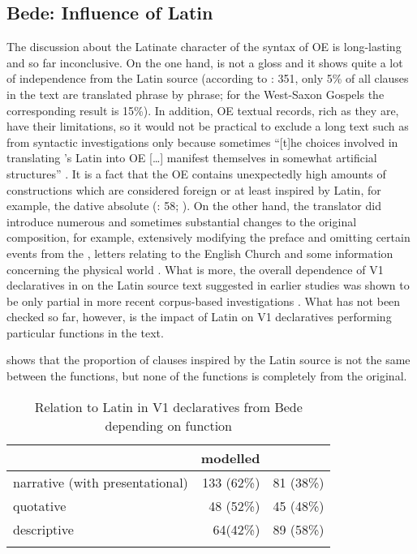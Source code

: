 \documentclass[output=paper,colorlinks,citecolor=brown]{langscibook}
\begin{document}
\subsection{Bede: Influence of Latin}
\label{sec:cichosz:4.2}

The discussion about the Latinate character of the syntax of OE  is long-lasting and so far inconclusive. On the one hand,  is not a gloss and it shows quite a lot of independence from the Latin source (according to \citealt{CichoszEtAl2016}: 351, only 5\% of all clauses in the text are translated phrase by phrase; for the West-Saxon Gospels the corresponding result is 15\%). In addition, OE textual records, rich as they are, have their limitations, so it would not be practical to exclude a long text such as  from syntactic investigations only because sometimes “[t]he choices involved in translating 's Latin into OE […] manifest themselves in somewhat artificial structures” \citep[9]{Rowley2011}. It is a fact that the OE  contains unexpectedly high amounts of constructions which are considered foreign or at least inspired by Latin, for example, the dative absolute (\citealt{Stanton2002}: 58; \citealt{Scheler1961}). On the other hand, the  translator did introduce numerous and sometimes substantial changes to the original composition, for example, extensively modifying the preface and omitting certain events from the , letters relating to the English Church and some information concerning the physical world \citep[86]{St-Jacques1983}. What is more, the overall dependence of V1 declaratives in  on the Latin source text suggested in earlier studies \citep{Ohkado2000} was shown to be only partial in more recent corpus-based investigations \citep{Cichosz2017}. What has not been checked so far, however, is the impact of Latin on V1 declaratives performing particular functions in the text. 

 shows that the proportion of clauses inspired by the Latin source is not the same between the functions, but none of the functions is completely  from the original.

\begin{table}
\begin{tabularx}{0.8\textwidth}{Xrr}
\lsptoprule
& \multicolumn{1}{l}{modelled} & \multicolumn{1}{l}{}{independent} \\
\midrule
narrative (with presentational) & {133 (62\%)} & {81 (38\%)}\\
quotative & {48 (52\%)} & {45 (48\%)}\\
descriptive  & {64(42\%)} & {89 (58\%)}\\
\lspbottomrule
\end{tabularx}
\caption{Relation to Latin in V1 declaratives from Bede depending on function}
\label{tab:cichosz:4}
\end{table}
\end{document}
